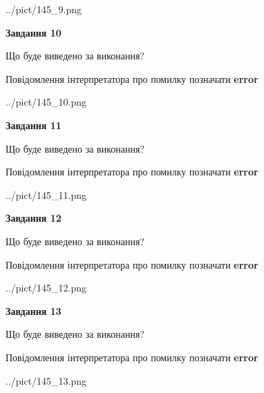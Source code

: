 \documentclass[11pt, ukrainian]{article}
\begin{document}
{\begin {large}
\begin{center}
	{../pict/145_9.png}
\end{center}
\newpage

{\begin {center}\textbf{Завдання 10}\end {center}}\par
Що буде виведено за виконання? \par
Повідомлення інтерпретатора про помилку позначати \textbf{error}

\begin{center}
	{../pict/145_10.png}
\end{center}
\newpage

{\begin {center}\textbf{Завдання 11}\end {center}}\par
Що буде виведено за виконання? \par
Повідомлення інтерпретатора про помилку позначати \textbf{error}

\begin{center}
	{../pict/145_11.png}
\end{center}
\newpage

{\begin {center}\textbf{Завдання 12}\end {center}}\par
Що буде виведено за виконання? \par
Повідомлення інтерпретатора про помилку позначати \textbf{error}

\begin{center}
	{../pict/145_12.png}
\end{center}
\newpage

{\begin {center}\textbf{Завдання 13}\end {center}}\par
Що буде виведено за виконання? \par
Повідомлення інтерпретатора про помилку позначати \textbf{error}

\begin{center}
	{../pict/145_13.png}
\end{center}
\newpage


\end{large}}
\end{document}
